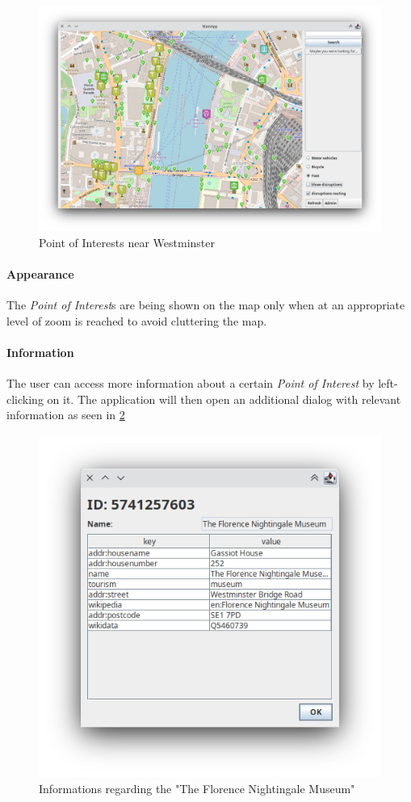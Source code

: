 \begin{figure}[H]
	\centering
	\includegraphics[width=\linewidth]{assets/mainapp1}
	\caption{Point of Interests near Westminster}
	\label{fig:mainapp1}
\end{figure}

\paragraph{Appearance}
The \textit{Point of Interest}s are being shown on the map only when at an 
appropriate level of zoom is reached to avoid cluttering the map.

\paragraph{Information}
The user can access more information about a certain \textit{Point of Interest} 
by left-clicking on it. The application will then open an additional dialog 
with relevant information as seen in \ref{fig:mainappdialog1}

\begin{figure}[H]
	\centering
	\includegraphics[width=0.5\linewidth]{assets/mainapp_dialog1}
	\caption[]{
		Informations regarding the "The Florence Nightingale Museum"
	}
	\label{fig:mainappdialog1}
\end{figure}

